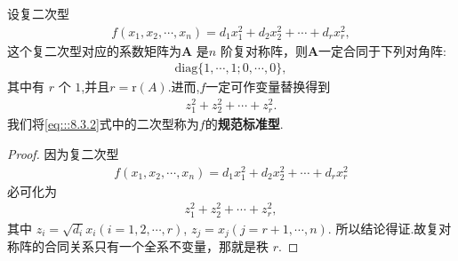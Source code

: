 \documentclass[../../main.tex]{subfiles}
\begin{document}
\begin{theorem}[复二次型的规范标准型]\label{theorem:复二次型的规范标准型}
设复二次型
\begin{align*}
f(x_1,x_2,\cdots,x_n)=d_1x_1^2 + d_2x_2^2 + \cdots + d_rx_r^2,
\end{align*}
这个复二次型对应的系数矩阵为$\boldsymbol{A}$ 是$n$ 阶复对称阵，则$\boldsymbol{A}$一定合同于下列对角阵:
\begin{align}
\mathrm{diag}\{1,\cdots,1;0,\cdots,0\},\label{eq:::8.3.3}
\end{align}
其中有 $r$ 个 $1$,并且$r=\mathrm{r}\left( A \right)$.进而,$f$一定可作变量替换得到
\begin{align}
z_1^2 + z_2^2 + \cdots + z_r^2.\label{eq:::8.3.2}
\end{align}
我们将\eqref{eq:::8.3.2}式中的二次型称为$f$的\textbf{规范标准型}.
\end{theorem}
\begin{proof}
因为复二次型
\begin{align*}
f(x_1,x_2,\cdots,x_n)=d_1x_1^2 + d_2x_2^2 + \cdots + d_rx_r^2
\end{align*}
必可化为
\begin{align*}
z_1^2 + z_2^2 + \cdots + z_r^2,
\end{align*}
其中 $z_i = \sqrt{d_i}x_i (i = 1,2,\cdots,r)$, $z_j = x_j (j = r + 1,\cdots,n)$. 所以结论得证.故复对称阵的合同关系只有一个全系不变量，那就是秩 $r$. 

\end{proof}
\end{document}
